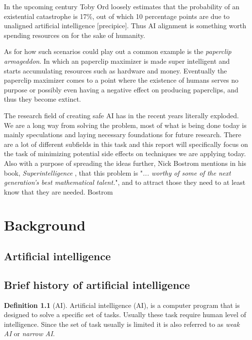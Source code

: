 \documentclass{report}
\newcommand{\autocite}{}
\theoremstyle{definition}
\newtheorem{definition}{Definition}[section]
\begin{document}
In the upcoming century Toby Ord loosely estimates that the probability of an existential catastrophe is 17\%, out of which 10 percentage points are due to unaligned artificial intelligence \autocite{[precipice]}. Thus AI alignment is something worth spending resources on for the sake of humanity. 

As for how such scenarios could play out a common example is the \textit{paperclip armageddon}. In which an paperclip maximizer is made super intelligent and starts accumulating resources such as hardware and money. Eventually the paperclip maximizer comes to a point where the existence of humans serves no purpose or possibly even having a negative effect on producing paperclips, and thus they become extinct.



The research field of creating safe AI has in the recent years literally exploded. We are a long way from solving the problem, most of what is being done today is mainly speculations and laying necessary foundations for future research. There are a lot of different subfields in this task and this report will specifically focus on the task of minimizing potential side effects on techniques we are applying today. Also with a purpose of spreading the ideas further, Nick Bostrom mentions in his book, \textit{Superintelligence} , that this problem is "\textit{... worthy of some of the next generation's best mathematical talent.}", and to attract those they need to at least know that they are needed. 
\autocite{Bostrom}






\chapter{Background}

\section{Artificial intelligence}

\section{Brief history of artificial intelligence}
\begin{definition}[AI]
   Artificial intelligence (AI), is a computer program that is designed to solve a specific set of tasks. Usually these task require human level of intelligence. Since the set of task usually is limited it is also referred to as \textit{weak AI} or \textit{narrow AI}.
   \label{AI}
\end{definition}
\end{document}
